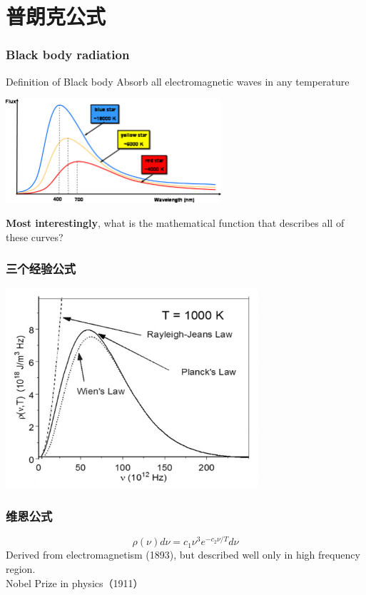 \section{普朗克公式}

\begin{frame}
    \frametitle{Black body radiation}
    \begin{tcolorbox2}{Definition of Black body}
        Absorb all electromagnetic waves in any temperature
    \end{tcolorbox2}
    \begin{center}
        \includegraphics[width=0.6\textwidth]{figs/blackbody_radn_curves.png}
    \end{center}
    \textbf{\color{deepred} Most interestingly}, what is the mathematical function that describes all of these curves?
\end{frame}

\begin{frame}
    \frametitle{三个经验公式}
    \begin{center}
        \includegraphics[width=0.7\textwidth]{figs/threelaws.png}
    \end{center}
\end{frame}

\begin{frame}
    \frametitle{维恩公式}
    \begin{equation*}
        \rho(\nu) d \nu=c_{1} \nu^{3} e^{-c_{2} \nu / T} d \nu 
    \end{equation*}
    Derived from electromagnetism (1893), but described well only in high frequency region.\\ 
    {\color{deepred} Nobel Prize in physics（1911）}\\
\end{frame}

